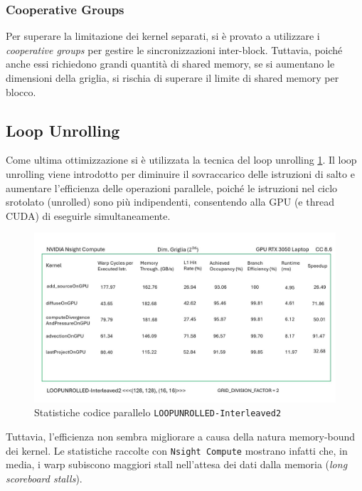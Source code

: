 \documentclass[12pt,a4paper,openany,twoside]{article}
\begin{document}
\subsubsection{Cooperative Groups}
Per superare la limitazione dei kernel separati, si è provato a utilizzare i \textit{cooperative groups} per gestire le sincronizzazioni inter-block. Tuttavia, poiché anche essi richiedono grandi quantità di shared memory, se si aumentano le dimensioni della griglia, si rischia di superare il limite di shared memory per blocco.

\subsection{Loop Unrolling}
Come ultima ottimizzazione si è utilizzata la tecnica del loop unrolling \ref{fig:9}. Il loop unrolling viene introdotto per diminuire il sovraccarico delle istruzioni di salto e aumentare l'efficienza delle operazioni parallele, poiché le istruzioni nel ciclo srotolato (unrolled) sono più indipendenti, consentendo alla GPU (e thread CUDA) di eseguirle simultaneamente.

\begin{figure}
    \centering
    \includegraphics[width=0.75\linewidth]{figures/Slide9.jpg}
    \caption{Statistiche codice parallelo \texttt{LOOPUNROLLED-Interleaved2}}
    \label{fig:9}
\end{figure}

Tuttavia, l'efficienza non sembra migliorare a causa della natura memory-bound dei kernel. Le statistiche raccolte con \texttt{Nsight Compute} mostrano infatti che, in media, i warp subiscono maggiori stall nell'attesa dei dati dalla memoria (\emph{long scoreboard stalls}).

\end{document}
